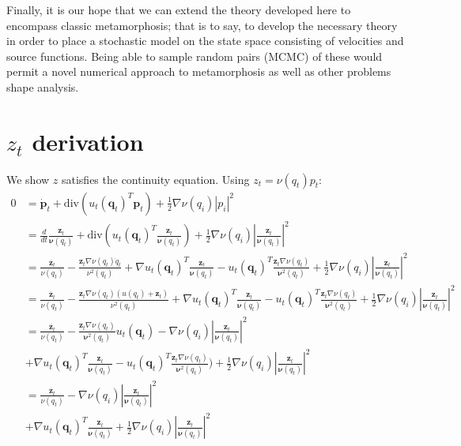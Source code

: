 \documentclass[runningheads]{llncs}
\newcommand{\mdiv}{\text{div}}
\begin{document}
Finally, it is our hope that we can extend the theory developed here to
encompass classic metamorphosis; that is to say, to develop the necessary theory
in order to place a stochastic model on the state space consisting of velocities
and source functions. Being able to sample random pairs (MCMC) of these would
permit a novel numerical approach to metamorphosis as well as other problems
shape analysis.


\appendix \section{$z_t$ derivation}\label{app:z_derivation}

We show $z$ satisfies the continuity equation. Using $z_t = \nu(q_t)p_t$:
\begin{align*} 0 & = \dot{\mathbf p}_t + \mdiv(u_t(\mathbf q_t)^T \mathbf p_t) +
\frac12\nabla\nu(q_i) |p_i|^2\\
& = \frac{d}{dt}\frac{\mathbf z_t}{\mathbf \nu(q_t)} + \mdiv(u_t(\mathbf q_t)^T \frac{\mathbf z_t}{\mathbf \nu(q_t)}) 
    +  \frac12\nabla\nu(q_i) |\frac{\mathbf z_t}{\mathbf \nu(q_t)}|^2\\
& = \frac{\dot{\mathbf z_t}}{\nu(q_t)} - \frac{\mathbf z_t \nabla\nu(q_t)\dot{q}_t}{\nu^2(q_t)} + 
\nabla u_t(\mathbf q_t)^T \frac{\mathbf z_t}{\mathbf \nu(q_t)}
- u_t(\mathbf q_t)^T \frac{\mathbf z_t\nabla \nu(q_t)}{\mathbf \nu^2(q_t)}
    + \frac12\nabla\nu(q_i) |\frac{\mathbf z_t}{\mathbf \nu(q_t)}|^2\\
& = \frac{\dot{\mathbf z_t}}{\nu(q_t)} - \frac{\mathbf z_t \nabla\nu(q_t)(u(q_t)+ \mathbf z_t)}{\nu^2(q_t)} + 
\nabla u_t(\mathbf q_t)^T \frac{\mathbf z_t}{\mathbf \nu(q_t)}
- u_t(\mathbf q_t)^T \frac{\mathbf z_t\nabla \nu(q_t)}{\mathbf \nu^2(q_t)}
    + \frac12\nabla\nu(q_i) |\frac{\mathbf z_t}{\mathbf \nu(q_t)}|^2\\
& = \frac{\dot{\mathbf z_t}}{\nu(q_t)} - \frac{\mathbf z_t\nabla \nu(q_t)}{\mathbf \nu^2(q_t)}u_t(\mathbf q_t)
 - \nabla\nu(q_i) |\frac{\mathbf z_t}{\mathbf \nu(q_t)}|^2\\
&+  \nabla u_t(\mathbf q_t)^T \frac{\mathbf z_t}{\mathbf \nu(q_t)}
- u_t(\mathbf q_t)^T \frac{\mathbf z_t\nabla \nu(q_t)}{\mathbf \nu^2(q_t)})
    + \frac12\nabla\nu(q_i) |\frac{\mathbf z_t}{\mathbf \nu(q_t)}|^2\\
& = \frac{\dot{\mathbf z_t}}{\nu(q_t)}
 - \nabla\nu(q_i) |\frac{\mathbf z_t}{\mathbf \nu(q_t)}|^2\\
& + \nabla u_t(\mathbf q_t)^T \frac{\mathbf z_t}{\mathbf \nu(q_t)} + \frac12\nabla\nu(q_i) |\frac{\mathbf z_t}{\mathbf \nu(q_t)}|^2\\
\end{align*}
\end{document}
